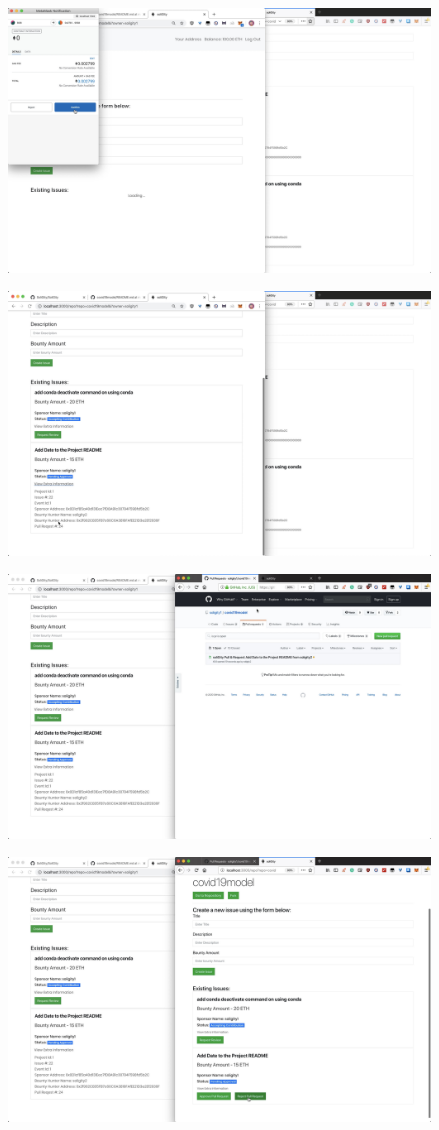 \documentclass[12pt]{article}
\renewcommand{\_}{\kern-1.5pt\textunderscore\kern-1.5pt}
\begin{document}
\includegraphics[height=7cm]{graphs/35. bob_review_request_metamask}

\includegraphics[height=7cm]{graphs/36. issue_info_updated}

\includegraphics[height=7cm]{graphs/37. bob_pull_request_github}

\includegraphics[height=7cm]{graphs/38. alice_reject_pull_request}
\end{document}
